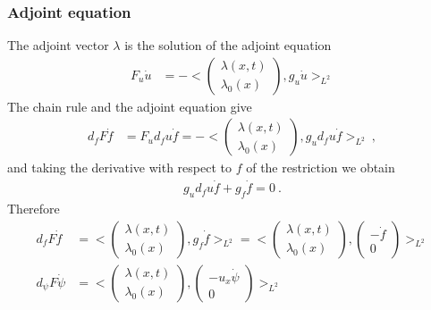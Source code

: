 \documentclass{beamer}
\begin{document}
\begin{frame}
\frametitle{Adjoint equation}
The \alert{adjoint} vector $\lambda$ is the solution of the \alert{adjoint equation}
\begin{equation}\label{adjoint}
  \begin{split}
    F_{u} \dot{u} &= - \biggl< \left( \begin{array}{c}
          \lambda(x, t) \\
          \lambda_{0}(x) \end{array} \right), g_{u} \dot{u}\biggr>_{L^2}	
  \end{split}
\end{equation}
The chain rule and the adjoint equation give
\begin{equation*}
  \begin{split}
   d_{f} F \dot{f} &= F_{u} d_{f} u \dot{f} = - \biggl< \left( \begin{array}{c}
          \lambda(x, t) \\
          \lambda_{0}(x) \end{array} \right), g_{u} d_{f} u \dot{f}\biggr>_{L^2}\:,	 
  \end{split}
\end{equation*}
and taking the derivative with respect to $f$ of the restriction we obtain
\begin{equation*}
  \begin{split}
    g_{u} d_{f} u \dot{f} + g_f \dot{f} = 0\:.
  \end{split}
\end{equation*}
Therefore
\begin{equation*}
  \begin{split}
    d_f F \dot{f} & = \biggl< \left( \begin{array}{c}
          \lambda(x, t) \\
          \lambda_{0}(x) \end{array} \right), g_{f} \dot{f}\biggr>_{L^2}
    = \biggl< \left( \begin{array}{c}
          \lambda(x, t) \\
          \lambda_{0}(x) \end{array} \right),\left( \begin{array}{c}
                                    - \dot{f}\\
                                    0 \end{array} \right)\biggr>_{L^2}\\
    d_{\psi} F \dot{\psi} &= \biggl< \left( \begin{array}{c}
          \lambda(x, t) \\
          \lambda_{0}(x) \end{array} \right),\left( \begin{array}{c}
                                    - u_{x} \dot{\psi}\\
                                    0 \end{array} \right)\biggr>_{L^2}
  \end{split}
\end{equation*}

\end{frame}
\end{document}
